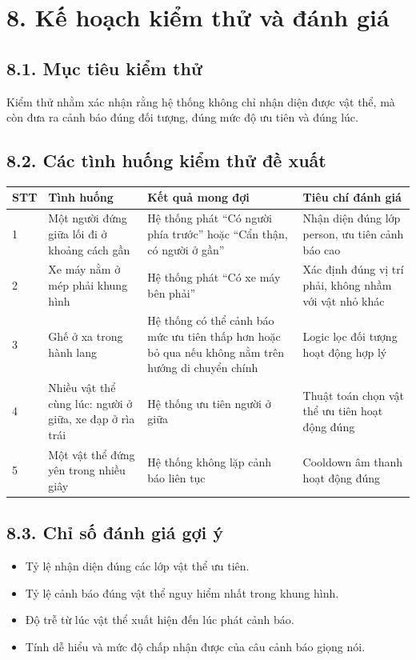 \documentclass[11pt, a4paper]{article}
\begin{document}
\section*{8. Kế hoạch kiểm thử và đánh giá}
\subsection*{8.1. Mục tiêu kiểm thử}
Kiểm thử nhằm xác nhận rằng hệ thống không chỉ nhận diện được vật thể, mà còn đưa ra cảnh báo đúng đối tượng, đúng mức độ ưu tiên và đúng lúc.

\subsection*{8.2. Các tình huống kiểm thử đề xuất}
\begin{center}
\begin{tabularx}{\textwidth}{|p{1.2cm}|X|X|X|}
\hline
\textbf{STT} & \textbf{Tình huống} & \textbf{Kết quả mong đợi} & \textbf{Tiêu chí đánh giá} \\ \hline
1 & Một người đứng giữa lối đi ở khoảng cách gần & Hệ thống phát ``Có người phía trước'' hoặc ``Cẩn thận, có người ở gần'' & Nhận diện đúng lớp person, ưu tiên cảnh báo cao \\ \hline
2 & Xe máy nằm ở mép phải khung hình & Hệ thống phát ``Có xe máy bên phải'' & Xác định đúng vị trí phải, không nhầm với vật nhỏ khác \\ \hline
3 & Ghế ở xa trong hành lang & Hệ thống có thể cảnh báo mức ưu tiên thấp hơn hoặc bỏ qua nếu không nằm trên hướng di chuyển chính & Logic lọc đối tượng hoạt động hợp lý \\ \hline
4 & Nhiều vật thể cùng lúc: người ở giữa, xe đạp ở rìa trái & Hệ thống ưu tiên người ở giữa & Thuật toán chọn vật thể ưu tiên hoạt động đúng \\ \hline
5 & Một vật thể đứng yên trong nhiều giây & Hệ thống không lặp cảnh báo liên tục & Cooldown âm thanh hoạt động đúng \\ \hline
\end{tabularx}
\end{center}

\subsection*{8.3. Chỉ số đánh giá gợi ý}
\begin{itemize}
    \item Tỷ lệ nhận diện đúng các lớp vật thể ưu tiên.
    \item Tỷ lệ cảnh báo đúng vật thể nguy hiểm nhất trong khung hình.
    \item Độ trễ từ lúc vật thể xuất hiện đến lúc phát cảnh báo.
    \item Tính dễ hiểu và mức độ chấp nhận được của câu cảnh báo giọng nói.
\end{itemize}
\end{document}
